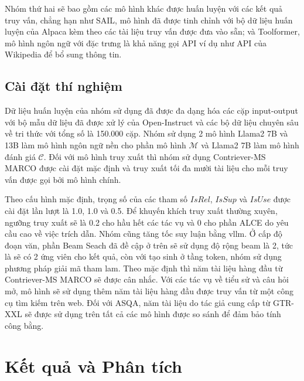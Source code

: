 \documentclass{article}
\begin{document}
Nhóm thứ hai sẽ bao gồm các mô hình khác được huấn luyện với các kết quả truy vấn, chẳng hạn như SAIL, mô hình đã được tinh chỉnh với bộ dữ liệu huấn luyện của Alpaca kèm theo các tài liệu truy vấn được đưa vào sẵn; và Toolformer, mô hình ngôn ngữ với đặc trưng là khả năng gọi API ví dụ như  API của Wikipedia để bổ sung thông tin.

\subsection{Cài đặt thí nghiệm}
Dữ liệu huấn luyện của nhóm sử dụng đã được đa dạng hóa các cặp input-output với bộ mẫu dữ liệu đã được xử lý của Open-Instruct và các bộ dữ liệu chuyên sâu về tri thức với tổng số là 150.000 cặp. Nhóm sử dụng 2 mô hình Llama2 7B và 13B làm mô hình ngôn ngữ nền cho phần mô hình $\mathcal{M}$ và Llama2 7B làm mô hình đánh giá $\mathcal{C}$. Đối với mô hình truy xuất thì nhóm sử dụng Contriever-MS MARCO được cài đặt mặc định và truy xuất tối đa mười tài liệu cho mỗi truy vấn được gọi bởi mô hình chính. 

Theo cấu hình mặc định, trọng số của các tham số $IsRel$, $IsSup$ và $IsUse$ được cài đặt lần lượt là 1.0, 1.0 và 0.5. Để khuyến khích truy xuất thường xuyên, ngưỡng truy xuất sẽ là 0.2 cho hầu hết các tác vụ và 0 cho phần ALCE do yêu cầu cao về việc trích dẫn. Nhóm cũng tăng tốc suy luận bằng vllm. Ở cấp độ đoạn văn, phần Beam Seach đã đề cập ở trên sẽ sử dụng độ rộng beam là 2, tức là sẽ có 2 ứng viên cho kết quả, còn với tạo sinh ở tầng token, nhóm sử dụng phương pháp giải mã tham lam. Theo mặc định thì năm tài liệu hàng đầu từ Contriever-MS MARCO sẽ được cân nhắc. Với các tác vụ về tiểu sử và câu hỏi mở, mô hình sẽ sử dụng thêm năm tài liệu hàng đầu được truy vấn từ một công cụ tìm kiếm trên web. Đối với ASQA, năm tài liệu do tác giả cung cấp từ  GTR-XXL sẽ được sử dụng trên tất cả các mô hình được so sánh để đảm bảo tính công bằng.

\section{Kết quả và Phân tích} \label{sec:ketqua}
\end{document}

